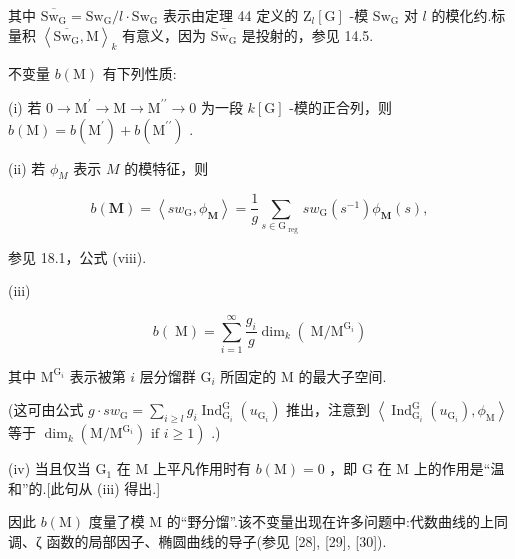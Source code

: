 \documentclass[10pt]{article}
\begin{document}
其中 \(\overline{{\mathrm{{Sw}}}_{\mathrm{G}}} = {\mathrm{{Sw}}}_{\mathrm{G}}/l \cdot  {\mathrm{{Sw}}}_{\mathrm{G}}\) 表示由定理 44 定义的 \({\mathrm{Z}}_{l}\left\lbrack  \mathrm{G}\right\rbrack\) -模 \({\mathrm{{Sw}}}_{\mathrm{G}}\) 对 \(l\) 的模化约.标量积 \({\left\langle  \overline{{\mathrm{{Sw}}}_{\mathrm{G}}},\mathrm{M}\right\rangle  }_{k}\) 有意义，因为 \(\overline{{\mathrm{{Sw}}}_{\mathrm{G}}}\) 是投射的，参见 14.5.

不变量 \(b\left( \mathrm{M}\right)\) 有下列性质:

(i) 若 \(0 \rightarrow  {\mathrm{M}}^{\prime } \rightarrow  \mathrm{M} \rightarrow  {\mathrm{M}}^{\prime \prime } \rightarrow  0\) 为一段 \(k\left\lbrack  \mathrm{G}\right\rbrack\) -模的正合列，则 \(b\left( \mathrm{M}\right)  = b\left( {\mathrm{M}}^{\prime }\right)  + b\left( {\mathrm{M}}^{\prime \prime }\right)\) .

(ii) 若 \({\phi }_{M}\) 表示 \(M\) 的模特征，则

\[
b\left( \mathbf{M}\right)  = \left\langle  {s{w}_{\mathrm{G}},{\phi }_{\mathbf{M}}}\right\rangle   = \frac{1}{g}\mathop{\sum }\limits_{{s \in  {\mathrm{G}}_{\text{ reg }}}}s{w}_{\mathrm{G}}\left( {s}^{-1}\right) {\phi }_{\mathbf{M}}\left( s\right) ,
\]

参见 18.1，公式 (viii).

(iii)

\[
b\left( \mathrm{\;M}\right)  = \mathop{\sum }\limits_{{i = 1}}^{\infty }\frac{{g}_{i}}{g}{\dim }_{k}\left( {\mathrm{\;M}/{\mathrm{M}}^{{\mathrm{G}}_{i}}}\right)
\]

其中 \({\mathrm{M}}^{{\mathrm{G}}_{i}}\) 表示被第 \(i\) 层分馏群 \({\mathrm{G}}_{i}\) 所固定的 \(\mathrm{M}\) 的最大子空间.

(这可由公式 \(g \cdot  s{w}_{\mathrm{G}} = \mathop{\sum }\limits_{{i \geq  l}}{g}_{i}{\operatorname{Ind}}_{{\mathrm{G}}_{i}}^{\mathrm{G}}\left( {u}_{{\mathrm{G}}_{i}}\right)\) 推出，注意到 \(\left\langle  {{\operatorname{Ind}}_{{\mathrm{G}}_{i}}^{\mathrm{G}}\left( {u}_{{\mathrm{G}}_{i}}\right) ,{\phi }_{\mathrm{M}}}\right\rangle\) 等于 \(\left. {{\dim }_{k}\left( {\mathrm{M}/{\mathrm{M}}^{{\mathrm{G}}_{i}}}\right) \text{ if }i \geq  1}\right)\) .)

(iv) 当且仅当 \({\mathrm{G}}_{1}\) 在 \(\mathrm{M}\) 上平凡作用时有 \(b\left( \mathrm{M}\right)  = 0\) ，即 \(\mathrm{G}\) 在 \(\mathrm{M}\) 上的作用是“温和”的.[此句从 (iii) 得出.]

因此 \(b\left( \mathrm{M}\right)\) 度量了模 M 的“野分馏”.该不变量出现在许多问题中:代数曲线的上同调、ζ 函数的局部因子、椭圆曲线的导子(参见 [28], [29], [30]).
\end{document}
